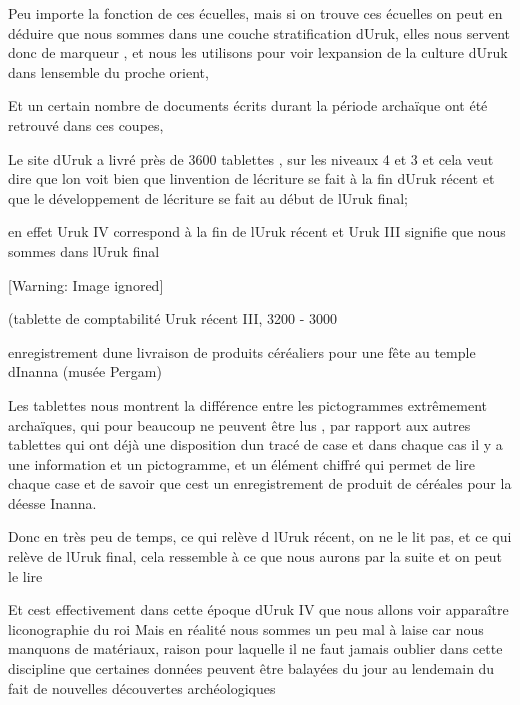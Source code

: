 \documentclass{article}
\begin{document}
Peu importe la fonction de ces écuelles, mais si on trouve ces écuelles
on peut en déduire que nous sommes dans une couche stratification
d{\textquotesingle}Uruk, elles nous servent donc de marqueur , et nous
les utilisons pour voir l{\textquotesingle}expansion de la culture
d{\textquotesingle}Uruk dans l{\textquotesingle}ensemble du proche
orient, 

Et un certain nombre de documents écrits durant la période archaïque ont
été retrouvé dans ces coupes, 

Le site d{\textquotesingle}Uruk a livré près de 3600 tablettes , sur les
 niveaux 4 et 3 et cela veut dire que l{\textquotesingle}on voit bien
que l{\textquotesingle}invention de l{\textquotesingle}écriture se fait
à la fin d{\textquotesingle}Uruk récent et que le développement de
l{\textquotesingle}écriture se fait au début de l{\textquotesingle}Uruk
final;

en effet Uruk IV correspond à la fin de l{\textquotesingle}Uruk récent
et Uruk III signifie que nous sommes dans l{\textquotesingle}Uruk final

  [Warning: Image ignored] %
 

(tablette de comptabilité Uruk récent III, 3200 - 3000

enregistrement d{\textquotesingle}une livraison de produits céréaliers
pour une fête au temple d{\textquotesingle}Inanna (musée Pergam)

Les tablettes nous montrent la différence entre les pictogrammes
extrêmement archaïques, qui pour beaucoup ne peuvent être lus , par
rapport aux autres tablettes qui ont déjà une disposition
d{\textquotesingle}un tracé de case et dans chaque cas il y a une
information et un pictogramme,  et un élément chiffré qui  permet de
lire chaque case et de savoir que c{\textquotesingle}est un
enregistrement de produit de céréales pour la déesse Inanna.

Donc en très peu de temps, ce qui relève d{\textquotesingle}
l{\textquotesingle}Uruk récent, on ne le lit pas, et ce qui relève de
l{\textquotesingle}Uruk final, cela ressemble à ce que nous aurons par
la suite et on peut le lire

Et c{\textquotesingle}est effectivement dans cette époque
d{\textquotesingle}Uruk IV que nous allons voir apparaître
l{\textquotesingle}iconographie du roi Mais en réalité nous sommes un
peu mal à l{\textquotesingle}aise car nous manquons de matériaux,
raison pour laquelle il ne faut jamais oublier dans cette discipline
que certaines données peuvent être balayées du jour au lendemain du
fait de nouvelles découvertes archéologiques
\end{document}
